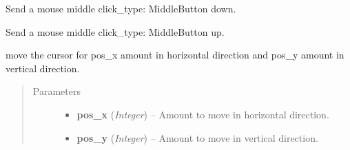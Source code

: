 \documentclass[letterpaper,10pt,english]{sphinxmanual}
\begin{document}

\begin{fulllineitems}
\label{macro:macro.middle_hold}
Send a mouse middle click\_type: MiddleButton down.

\end{fulllineitems}


\begin{fulllineitems}
\label{macro:macro.middle_release}
Send a mouse middle click\_type: MiddleButton up.

\end{fulllineitems}


\begin{fulllineitems}
\label{macro:macro.move}
move the cursor for pos\_x amount in horizontal direction and pos\_y amount
in vertical direction.
\begin{quote}\begin{description}
\item[{Parameters}] \leavevmode\begin{itemize}
\item {} 
\textbf{pos\_x} (\emph{Integer}) -- Amount to move in horizontal direction.

\item {} 
\textbf{pos\_y} (\emph{Integer}) -- Amount to move in vertical direction.

\end{itemize}

\end{description}\end{quote}

\end{fulllineitems}

\end{document}
